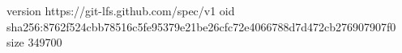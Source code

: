 version https://git-lfs.github.com/spec/v1
oid sha256:8762f524cbb78516c5fe95379e21be26cfc72e4066788d7d472cb276907907f0
size 349700
